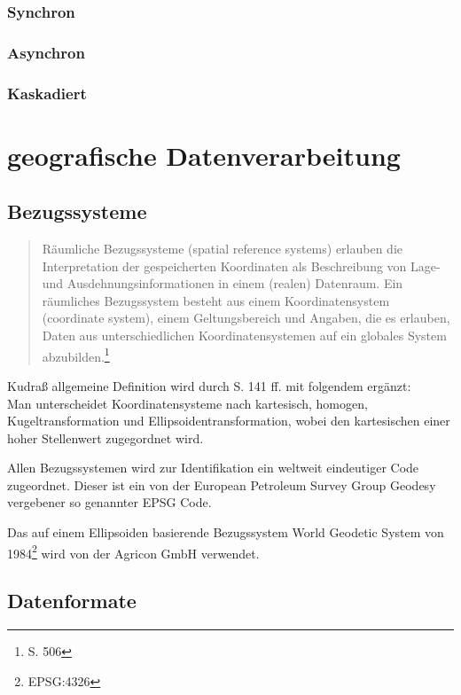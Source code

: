 \subsubsection{Synchron}

\subsubsection{Asynchron}

\subsubsection{Kaskadiert}

\newpage

\section{geografische Datenverarbeitung}

\subsection{Bezugssysteme}

\begin{quote}
Räumliche Bezugssysteme (spatial reference systems) erlauben die Interpretation der gespeicherten Koordinaten als Beschreibung von Lage- und Ausdehnungsinformationen in einem (realen) Datenraum. Ein räumliches Bezugssystem besteht aus einem Koordinatensystem (coordinate system), einem Geltungsbereich und Angaben, die es erlauben, Daten aus unterschiedlichen Koordinatensystemen auf ein globales System abzubilden.\footnote{\cite{book:kudrass} S. 506}
\end{quote}

Kudraß allgemeine Definition wird durch \cite{book:gi-theopluspraxis3} S. 141 ff. mit folgendem ergänzt:\\
Man unterscheidet Koordinatensysteme nach kartesisch, homogen, Kugeltransformation und Ellipsoidentransformation, wobei den kartesischen einer hoher Stellenwert zugegordnet wird.

Allen Bezugssystemen wird zur Identifikation ein weltweit eindeutiger Code zugeordnet.
Dieser ist ein von der European Petroleum Survey Group Geodesy vergebener so genannter EPSG Code.

Das auf einem Ellipsoiden basierende Bezugssystem World Geodetic System von 1984\footnote{EPSG:4326} wird von der Agricon GmbH verwendet.


\subsection{Datenformate}


